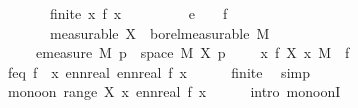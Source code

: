 \begin{isabellebody}
{\ \ \ \ \ \ \ finite{\isacharcolon}{\kern0pt}\ {\isachardoublequoteopen}{\isasymAnd}x{\isachardot}{\kern0pt}\ f\ x\ {\isacharless}{\kern0pt}\ {\isasyminfinity}{\isachardoublequoteclose}\isanewline
\ \ \ \ \ \ \ e{\isacharcolon}{\kern0pt}\ {\isachardoublequoteopen}{\isasymepsilon}\ {\isachargreater}{\kern0pt}\ {}{\isachardoublequoteclose}\ {\isachardoublequoteopen}f\ {\isasymepsilon}\ {\isachargreater}{\kern0pt}\ {}{\isachardoublequoteclose}\isanewline
\ \ \ \ \ \ \ {\isacharbrackleft}{\kern0pt}measurable{\isacharbrackright}{\kern0pt}{\isacharcolon}{\kern0pt}\ {\isachardoublequoteopen}X\ {\isasymin}\ borel{\isacharunderscore}{\kern0pt}measurable\ M{\isachardoublequoteclose}\isanewline
\ \ \ \ \ {\isachardoublequoteopen}emeasure\ M\ {\isacharbraceleft}{\kern0pt}p\ {\isasymin}\ space\ M{\isachardot}{\kern0pt}\ {\isacharparenleft}{\kern0pt}X\ p{\isacharparenright}{\kern0pt}\ {\isasymge}\ {\isasymepsilon}{\isacharbraceright}{\kern0pt}\ {\isasymle}\ {\isacharparenleft}{\kern0pt}{\isasymintegral}\isactrlsup {\isacharplus}{\kern0pt}\ x{\isachardot}{\kern0pt}\ f\ {\isacharparenleft}{\kern0pt}X\ x{\isacharparenright}{\kern0pt}\ {\isasympartial}M{\isacharparenright}{\kern0pt}\ {\isacharslash}{\kern0pt}\ f\ {\isasymepsilon}{\isachardoublequoteclose}%
}%
%
\isadelimproof
%
\endisadelimproof
%
\isatagproof
{}\isamarkupfalse%
\ {\isacharminus}{\kern0pt}\isanewline
\ \ \isamarkupfalse%
\ f{\isacharunderscore}{\kern0pt}eq{\isacharcolon}{\kern0pt}\ {\isachardoublequoteopen}f\ {\isacharequal}{\kern0pt}\ {\isacharparenleft}{\kern0pt}{\isasymlambda}x{\isachardot}{\kern0pt}\ ennreal\ {\isacharparenleft}{\kern0pt}enn{}real\ {\isacharparenleft}{\kern0pt}f\ x{\isacharparenright}{\kern0pt}{\isacharparenright}{\kern0pt}{\isacharparenright}{\kern0pt}{\isachardoublequoteclose}\isanewline
\ \ \ \ \isamarkupfalse%
\ finite\ \isamarkupfalse%
\ simp\isanewline
\ \ \isamarkupfalse%
\ {\isachardoublequoteopen}mono{\isacharunderscore}{\kern0pt}on\ {\isacharparenleft}{\kern0pt}range\ X{\isacharparenright}{\kern0pt}\ {\isacharparenleft}{\kern0pt}{\isasymlambda}x{\isachardot}{\kern0pt}\ enn{}real\ {\isacharparenleft}{\kern0pt}f\ x{\isacharparenright}{\kern0pt}{\isacharparenright}{\kern0pt}{\isachardoublequoteclose}\isanewline
\ \ \ \ \isamarkupfalse%
\ {\isacharparenleft}{\kern0pt}intro\ mono{\isacharunderscore}{\kern0pt}onI{\isacharparenright}{\kern0pt}\isanewline
\ \ \ \ \isamarkupfalse%

\end{isabellebody}
